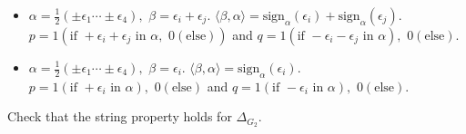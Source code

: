 \documentclass[11pt]{article}
\newenvironment{exercise}[1][Exercise]{\begin{trivlist}
\item[\hskip \labelsep {\bfseries #1}]}{\end{trivlist}}
\newenvironment{solution}[1][Solution]{\begin{trivlist}
\item[\hskip \labelsep {\bfseries #1}]}{\end{trivlist}}
\begin{document}
\begin{solution}
\begin{enumerate}
\begin{itemize}
\item $\alpha = \frac{1}{2} ( \pm \epsilon_1 \cdots \pm \epsilon_4
), \,\, \beta = \epsilon_i + \epsilon_j$. $\langle \beta, \alpha
\rangle = \mbox{sign}_{\alpha}(\epsilon_i)+
\mbox{sign}_{\alpha}(\epsilon_j)$. $p = 1 ( \mbox{if } +\epsilon_i
+ \epsilon_j \mbox{ in } \alpha, \,\, 0 ( \mbox{else} ) )$ and $q
= 1 ( \mbox{if } -\epsilon_i - \epsilon_j \mbox{ in } \alpha),
\,\, 0 (\mbox{else} )$.

\item $\alpha = \frac{1}{2} ( \pm \epsilon_1 \cdots \pm \epsilon_4
), \,\, \beta = \epsilon_i$. $\langle \beta, \alpha \rangle =
\mbox{sign}_{\alpha}(\epsilon_i)$. $p = 1 (\mbox{if } +\epsilon_i
\mbox{ in } \alpha) , \,\, 0 (\mbox{else})$ and $q = 1 (\mbox{if }
-\epsilon_i\mbox{ in } \alpha), \,\, 0 (\mbox{else})$.
\end{itemize}
%
\end{enumerate}
\end{solution}
%
%
\begin{exercise}
Check that the string property holds for $\Delta_{G_2}$.
\end{exercise}
%
\end{document}
